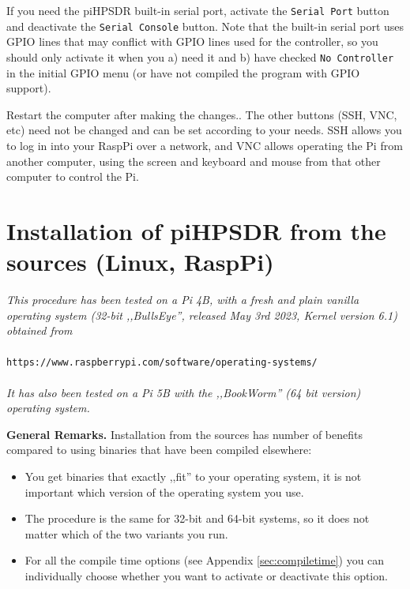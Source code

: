 \documentclass[12pt]{book}
\def\rett#1{\texttt{\color{red}#1}}
\def\pH{pi\-HPSDR\xspace}
\begin{document}
If you need the \pH built-in serial port, activate the \rett{Serial Port} button and deactivate
the \rett{Serial Console} button. Note that the built-in serial port uses GPIO lines that may
conflict with GPIO lines used for the controller, so
you should only activate it when you a) need it and b) have checked \rett{No Controller} in the
initial GPIO menu (or have not compiled the program with GPIO support).

Restart the computer after making the changes..
The other buttons (SSH, VNC, etc) need not be changed and can be set according to your needs. SSH allows
you to log in into your RaspPi over a network, and VNC allows operating the Pi from another computer,
using the screen and keyboard and mouse from that other computer to control the Pi.

\chapter[Linux: piHPDSR install from sources]{Installation of \pH from the sources (Linux, RaspPi)}
\label{sec:installsources}
\textit{This procedure has been tested on a Pi 4B, with a fresh and plain vanilla operating
system (32-bit ,,BullsEye'', released May 3rd 2023, Kernel version 6.1) obtained from} \\
\\
\texttt{https://www.raspberrypi.com/software/operating-systems/} \\
\\
\textit{It has also been tested on a Pi 5B with the ,,BookWorm'' (64 bit version) operating system.}

\textbf{General Remarks.}
Installation from the sources has number of benefits compared to using binaries that have
been compiled elsewhere:

\begin{itemize}
\item{You get binaries that exactly ,,fit'' to your operating system, it is not important which version
of the operating system you use.}
\item{The procedure is the same for 32-bit and 64-bit systems, so it does not matter
which of the two variants you run.}
\item{For all the compile time options (see Appendix \ref{sec:compiletime}) you can individually choose
whether you want to activate or deactivate this option.}
\end{itemize}
\end{document}
